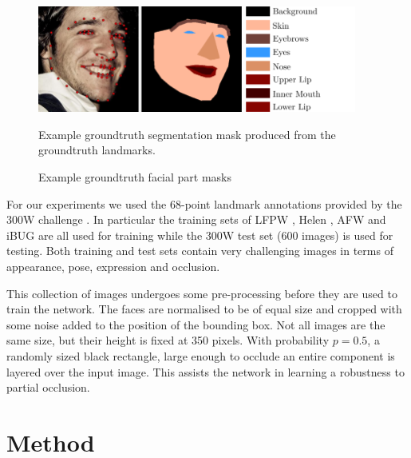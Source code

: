 \begin{figure}
\centering
\includegraphics[height=3.5cm]{figs/gtmasks.pdf}
\hspace{-1.4mm}
\includegraphics[height=3.5cm]{figs/gtmasks_key.pdf}
\caption{Example groundtruth facial part masks}{Example groundtruth
  segmentation mask produced from the groundtruth landmarks.}
\label{fig:gtmasks}
\end{figure}

For our experiments we used the 68-point landmark annotations provided
by the 300W challenge \cite{sagonas2013300}. In particular the
training sets of LFPW \cite{belhumeur2011localizing}, Helen
\cite{le2012interactive}, AFW \cite{ramanan2011} and iBUG
\cite{sagonas2013300} are all used for training while the 300W test
set (600 images) is used for testing. Both training and test sets
contain very challenging images in terms of appearance, pose,
expression and occlusion.

This collection of images undergoes some pre-processing before they
are used to train the network. The faces are normalised to be of equal
size and cropped with some noise added to the position of the bounding
box. Not all images are the same size, but their height is fixed at
350 pixels. With probability $p=0.5$, a randomly sized black
rectangle, large enough to occlude an entire component is layered over
the input image. This assists the network in learning a robustness to
partial occlusion.



\section{Method}
\label{sec:proposed}


